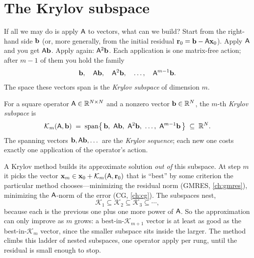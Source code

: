 \section{The Krylov subspace}
\label{sec:krylov-subspace}

If all we may do is apply $\mathsf{A}$ to vectors, what can we build? Start from the
right-hand side $\mathbf{b}$ (or, more generally, from the initial residual
$\mathbf{r}_0=\mathbf{b}-\mathsf{A}\mathbf{x}_0$). Apply $\mathsf{A}$ and you get $\mathsf{A}\mathbf{b}$. Apply again:
$\mathsf{A}^2\mathbf{b}$. Each application is one matrix-free action; after $m-1$ of them you
hold the family
\[
  \mathbf{b},\quad \mathsf{A}\mathbf{b},\quad \mathsf{A}^2\mathbf{b},\quad \dots,\quad \mathsf{A}^{m-1}\mathbf{b} .
\]
The space these vectors span is the \emph{Krylov subspace} of dimension $m$.

\begin{definition}
\label{def:krylov}
For a square operator $\mathsf{A}\in\mathbb{R}^{N\times N}$ and a nonzero vector
$\mathbf{b}\in\mathbb{R}^N$, the $m$-th \emph{Krylov subspace} is
\[
  \mathcal{K}_m(\mat{A},\vb)
   \;=\; \operatorname{span}\bigl\{\,\vb,\ \mat{A}\vb,\ \mat{A}^2\vb,\ \dots,\
   \mat{A}^{m-1}\vb\,\bigr\}
   \;\subseteq\; \Real^N .
\]
The spanning vectors $\mathbf{b},\mathsf{A}\mathbf{b},\dots$ are the \emph{Krylov sequence}; each
new one costs exactly one application of the operator's action.
\end{definition}

A Krylov method builds its approximate solution \emph{out of} this subspace. At
step $m$ it picks the vector $\mathbf{x}_m\in\mathbf{x}_0+\mathcal{K}_m(\mathsf{A},\mathbf{r}_0)$ that is
``best'' by some criterion the particular method chooses---minimizing the residual
norm (GMRES, \cref{ch:gmres}), minimizing the $\mathsf{A}$-norm of the error (CG,
\cref{ch:cg}). The subspaces nest,
\[
  \mathcal{K}_1 \subseteq \mathcal{K}_2 \subseteq \mathcal{K}_3 \subseteq \cdots,
\]
because each is the previous one plus one more power of $\mathsf{A}$. So the
approximation can only improve as $m$ grows: a best-in-$\mathcal{K}_{m+1}$ vector
is at least as good as the best-in-$\mathcal{K}_m$ vector, since the smaller
subspace sits inside the larger. The method climbs this ladder of nested
subspaces, one operator apply per rung, until the residual is small enough to stop.

